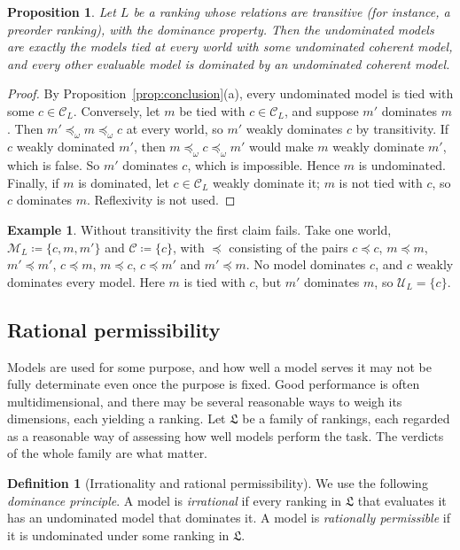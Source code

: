 \documentclass[11pt]{article}
\newtheorem{proposition}[theorem]{Proposition}
\theoremstyle{definition}
\newtheorem{definition}[theorem]{Definition}
\newtheorem{example}[theorem]{Example}
\theoremstyle{remark}
\newcommand{\M}{\mathcal M}
\newcommand{\C}{\mathcal C}
\newcommand{\U}{\mathcal U}
\newcommand{\Lf}{\mathfrak L}
\begin{document}
\begin{proposition}\label{prop:profiles}
Let $L$ be a ranking whose relations are transitive (for instance, a preorder ranking), with the dominance property. Then the undominated models are exactly the models tied at every world with some undominated coherent model, and every other evaluable model is dominated by an undominated coherent model.
\end{proposition}
\begin{proof}
By Proposition~\ref{prop:conclusion}(a), every undominated model is tied with some $c\in\C_L$. Conversely, let $m$ be tied with $c\in\C_L$, and suppose $m'$ dominates $m$. Then $m'\preceq_\omega m\preceq_\omega c$ at every world, so $m'$ weakly dominates $c$ by transitivity. If $c$ weakly dominated $m'$, then $m\preceq_\omega c\preceq_\omega m'$ would make $m$ weakly dominate $m'$, which is false. So $m'$ dominates $c$, which is impossible. Hence $m$ is undominated. Finally, if $m$ is dominated, let $c\in\C_L$ weakly dominate it; $m$ is not tied with $c$, so $c$ dominates $m$. Reflexivity is not used.
\end{proof}

\begin{example}\label{ex:intransitive}
Without transitivity the first claim fails. Take one world, $\M_L\coloneqq\{c,m,m'\}$ and $\C\coloneqq\{c\}$, with $\preceq$ consisting of the pairs $c\preceq c$, $m\preceq m$, $m'\preceq m'$, $c\preceq m$, $m\preceq c$, $c\preceq m'$ and $m'\preceq m$. No model dominates $c$, and $c$ weakly dominates every model. Here $m$ is tied with $c$, but $m'$ dominates $m$, so $\U_L=\{c\}$.
\end{example}


\subsection{Rational permissibility}\label{sec:permissible}
Models are used for some purpose, and how well a model serves it may not be fully determinate even once the purpose is fixed. Good performance is often multidimensional, and there may be several reasonable ways to weigh its dimensions, each yielding a ranking. Let $\Lf$ be a family of rankings, each regarded as a reasonable way of assessing how well models perform the task. The verdicts of the whole family are what matter.

\begin{definition}[Irrationality and rational permissibility]\label{def:permissibility}
We use the following \emph{dominance principle}. A model is \emph{irrational} if every ranking in $\Lf$ that evaluates it has an undominated model that dominates it. A model is \emph{rationally permissible} if it is undominated under some ranking in $\Lf$.
\end{definition}
\end{document}
